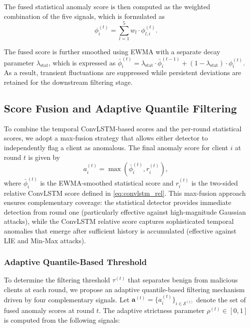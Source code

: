 The fused statistical anomaly score is then computed as the weighted combination of the five signals, which is formulated as
\begin{equation}\label{eq:stat_fused}
    \phi_i^{(t)} = \sum_{l=1}^{5} w_l \cdot \phi_{l,i}^{(t)}.
\end{equation}

The fused score is further smoothed using EWMA with a separate decay parameter $\lambda_{\text{stat}}$, which is expressed as $\bar{\phi}_i^{(t)} = \lambda_{\text{stat}} \cdot \bar{\phi}_i^{(t-1)} + (1 - \lambda_{\text{stat}}) \cdot \phi_i^{(t)}$. As a result, transient fluctuations are suppressed while persistent deviations are retained for the downstream filtering stage.

\subsection{Score Fusion and Adaptive Quantile Filtering}\label{subsec:filtering}

To combine the temporal ConvLSTM-based scores and the per-round statistical scores, we adopt a max-fusion strategy that allows either detector to independently flag a client as anomalous. The final anomaly score for client $i$ at round $t$ is given by
\begin{equation}\label{eq:fusion}
    a_i^{(t)} = \max\left(\bar{\phi}_i^{(t)}, r_i^{(t)}\right),
\end{equation}
where $\bar{\phi}_i^{(t)}$ is the EWMA-smoothed statistical score and $r_i^{(t)}$ is the two-sided relative ConvLSTM score defined in \eqref{eq:convlstm_rel}. This max-fusion approach ensures complementary coverage: the statistical detector provides immediate detection from round one (particularly effective against high-magnitude Gaussian attacks), while the ConvLSTM relative score captures sophisticated temporal anomalies that emerge after sufficient history is accumulated (effective against LIE and Min-Max attacks).

\subsubsection{Adaptive Quantile-Based Threshold}

To determine the filtering threshold $\tau^{(t)}$ that separates benign from malicious clients at each round, we propose an adaptive quantile-based filtering mechanism driven by four complementary signals. Let $\mathbf{a}^{(t)} = \{a_i^{(t)}\}_{i \in \mathcal{S}^{(t)}}$ denote the set of fused anomaly scores at round $t$. The adaptive strictness parameter $\rho^{(t)} \in [0, 1]$ is computed from the following signals:

